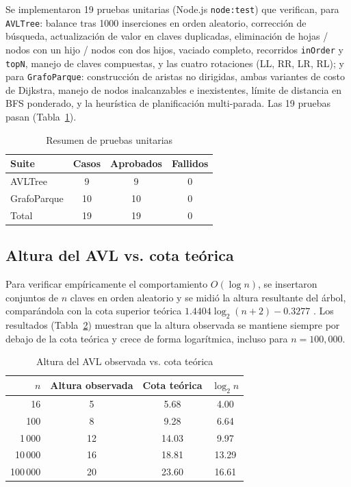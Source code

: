 \documentclass[conference]{IEEEtran}
\begin{document}
Se implementaron 19 pruebas unitarias (Node.js \texttt{node:test}) que
verifican, para \texttt{AVLTree}: balance tras 1000 inserciones en orden
aleatorio, correcci\'on de b\'usqueda, actualizaci\'on de valor en claves
duplicadas, eliminaci\'on de hojas / nodos con un hijo / nodos con dos hijos,
vaciado completo, recorridos \texttt{inOrder} y \texttt{topN}, manejo de
claves compuestas, y las cuatro rotaciones (LL, RR, LR, RL); y para
\texttt{GrafoParque}: construcci\'on de aristas no dirigidas, ambas variantes
de costo de Dijkstra, manejo de nodos inalcanzables e inexistentes, l\'imite
de distancia en BFS ponderado, y la heur\'istica de planificaci\'on
multi-parada. Las 19 pruebas pasan (Tabla~\ref{tab:tests}).

\begin{table}[htbp]
\caption{Resumen de pruebas unitarias}
\label{tab:tests}
\centering
\begin{tabular}{@{}lccc@{}}
\toprule
\textbf{Suite} & \textbf{Casos} & \textbf{Aprobados} & \textbf{Fallidos} \\
\midrule
AVLTree & 9 & 9 & 0 \\
GrafoParque & 10 & 10 & 0 \\
\midrule
Total & 19 & 19 & 0 \\
\bottomrule
\end{tabular}
\end{table}

\subsection{Altura del AVL vs. cota te\'orica}

Para verificar emp\'iricamente el comportamiento $O(\log n)$, se insertaron
conjuntos de $n$ claves en orden aleatorio y se midi\'o la altura resultante
del \'arbol, compar\'andola con la cota superior te\'orica
$1.4404 \log_2(n+2) - 0.3277$ \cite{knuth1998}. Los resultados
(Tabla~\ref{tab:altura}) muestran que la altura observada se mantiene siempre
por debajo de la cota te\'orica y crece de forma logar\'itmica, incluso para
$n = 100{,}000$.

\begin{table}[htbp]
\caption{Altura del AVL observada vs. cota te\'orica}
\label{tab:altura}
\centering
\begin{tabular}{@{}rccc@{}}
\toprule
\textbf{$n$} & \textbf{Altura observada} & \textbf{Cota te\'orica} & $\log_2 n$ \\
\midrule
16 & 5 & 5.68 & 4.00 \\
100 & 8 & 9.28 & 6.64 \\
1\,000 & 12 & 14.03 & 9.97 \\
10\,000 & 16 & 18.81 & 13.29 \\
100\,000 & 20 & 23.60 & 16.61 \\
\bottomrule
\end{tabular}
\end{table}
\end{document}

